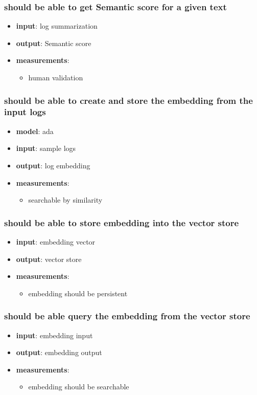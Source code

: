 \documentclass[conference]{IEEEtran}
\begin{document}
\subsubsection{should be able to get Semantic score for a given text}
\begin{itemize}
    \item \textbf{input}: log summarization
    \item \textbf{output}: Semantic score 
    \item \textbf{measurements}:
    \begin{itemize}
        \item human validation
    \end{itemize}
\end{itemize}

\subsubsection{should be able to create and store the embedding from the input logs}
\begin{itemize}
    \item \textbf{model}: ada
    \item \textbf{input}: sample logs
    \item \textbf{output}: log embedding
    \item \textbf{measurements}:
    \begin{itemize}
        \item searchable by similarity
    \end{itemize}
\end{itemize}

\subsubsection{should be able to store embedding into the vector store}
\begin{itemize}
    \item \textbf{input}: embedding vector
    \item \textbf{output}: vector store
    \item \textbf{measurements}:
    \begin{itemize}
        \item embedding should be persistent
    \end{itemize}
\end{itemize}

\subsubsection{should be able query the embedding from the vector store}
\begin{itemize}
    \item \textbf{input}: embedding input
    \item \textbf{output}: embedding output
    \item \textbf{measurements}:
    \begin{itemize}
        \item embedding should be searchable
    \end{itemize}
\end{itemize}
\end{document}
